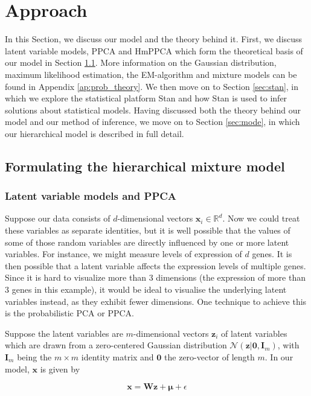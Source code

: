 \chapter{Approach}\label{sec:approach}
In this Section, we discuss our model and the theory behind it. First, we discuss latent variable models, PPCA and HmPPCA which form the theoretical basis of our model in Section \ref{sec:hm_model}. More information on the Gaussian distribution, maximum likelihood estimation, the EM-algorithm and mixture models can be found in Appendix \ref{ap:prob_theory}. We then move on to Section \ref{sec:stan}, in which we explore the statistical platform Stan and how Stan is used to infer solutions about statistical models. Having discussed both the theory behind our model and our method of inference, we move on to Section \ref{sec:mode}, in which our hierarchical model is described in full detail.


\section{Formulating the hierarchical mixture model}\label{sec:hm_model}

\subsection{Latent variable models and PPCA}
Suppose our data consists of $d$-dimensional vectors $\bm{x}_i\in \mathbb{R}^d$. Now we could treat these variables as separate identities, but it is well possible that the values of some of those random variables are directly influenced by one or more latent variables. For instance, we might measure levels of expression of $d$ genes. It is then possible that a latent variable affects the expression levels of multiple genes. Since it is hard to visualize more than $3$ dimensions (the expression of more than $3$ genes in this example), it would be ideal to visualise the underlying latent variables instead, as they exhibit fewer dimensions. One technique to achieve this is the probabilistic PCA or PPCA.

Suppose the latent variables are $m$-dimensional vectors $\bm{z}_i$ of latent variables which are drawn from a zero-centered Gaussian distribution $\mathcal{N}(\bm{z}|\bm{0},\bm{I}_m)$, with $\bm{I}_m$ being the $m \times m$ identity matrix and $\bm{0}$ the zero-vector of length $m$. In our model, $\bm{x}$ is given by 

\begin{equation}\label{eq:x}
\bm{x} = \bm{W}\bm{z} + \bm{\mu} + \epsilon    
\end{equation}

